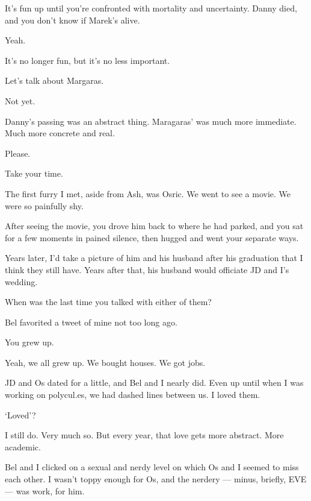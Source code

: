 \begin{leftcolumn}
\begin{ally}
It's fun up until you're confronted with mortality and uncertainty. Danny died, and you don't know if Marek's alive.
\end{ally}
Yeah.

It's no longer fun, but it's no less important.

\begin{ally}
Let's talk about Margaras.
\end{ally}
Not yet.

\begin{ally}
Danny's passing was an abstract thing. Maragaras' was much more immediate. Much more concrete and real.
\end{ally}
Please.

\begin{ally}
Take your time.
\end{ally}
\newpage

The first furry I met, aside from Ash, was Osric. We went to see a movie. We were so painfully shy.

\begin{ally}
After seeing the movie, you drove him back to where he had parked, and you sat for a few moments in pained silence, then hugged and went your separate ways.
\end{ally}
Years later, I'd take a picture of him and his husband after his graduation that I think they still have. Years after that, his husband would officiate JD and I's wedding.

\begin{ally}
When was the last time you talked with either of them?
\end{ally}
Bel favorited a tweet of mine not too long ago.

\begin{ally}
You grew up.
\end{ally}
Yeah, we all grew up. We bought houses. We got jobs.

JD and Os dated for a little, and Bel and I nearly did. Even up until when I was working on polycul.es, we had dashed lines between us. I loved them.

\begin{ally}
`Loved'?
\end{ally}
I still do. Very much so. But every year, that love gets more abstract. More academic.

Bel and I clicked on a sexual and nerdy level on which Os and I seemed to miss each other. I wasn't toppy enough for Os, and the nerdery --- minus, briefly, EVE --- was work, for him.


\end{leftcolumn}

